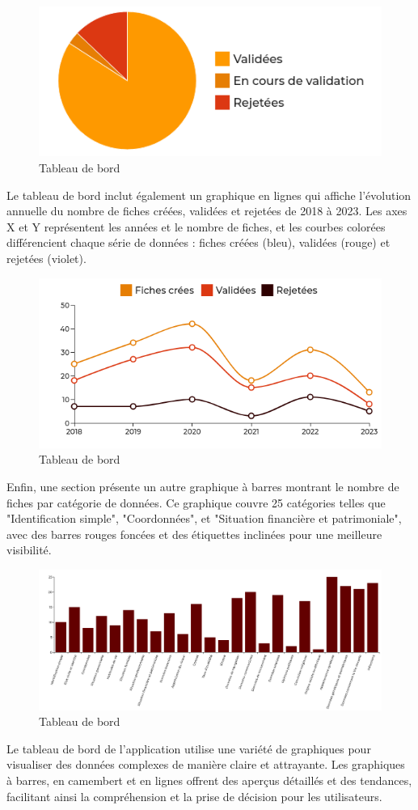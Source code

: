 \begin{figure}[H]
    \centering
    \includegraphics[width=.5\textwidth]{images/guis/dashboard2.png}
    \caption{Tableau de bord}
\end{figure}

\noindent Le tableau de bord inclut également un graphique en lignes qui affiche l'évolution annuelle du nombre de fiches créées, validées et rejetées de 2018 à 2023. Les axes X et Y représentent les années et le nombre de fiches, et les courbes colorées différencient chaque série de données : fiches créées (bleu), validées (rouge) et rejetées (violet).

\begin{figure}[H]
    \centering
    \includegraphics[width=.7\textwidth]{images/guis/dashboard3.png}
    \caption{Tableau de bord}
\end{figure}

\noindent Enfin, une section présente un autre graphique à barres montrant le nombre de fiches par catégorie de données. Ce graphique couvre 25 catégories telles que "Identification simple", "Coordonnées", et "Situation financière et patrimoniale", avec des barres rouges foncées et des étiquettes inclinées pour une meilleure visibilité.


\begin{figure}[H]
    \centering
    \includegraphics[width=\textwidth]{images/guis/dashboard4.png}
    \caption{Tableau de bord}
\end{figure}

\noindent Le tableau de bord de l'application utilise une variété de graphiques pour visualiser des données complexes de manière claire et attrayante. Les graphiques à barres, en camembert et en lignes offrent des aperçus détaillés et des tendances, facilitant ainsi la compréhension et la prise de décision pour les utilisateurs.
